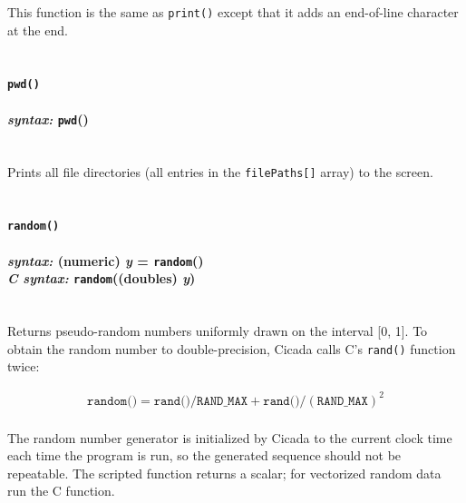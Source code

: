 \documentclass{article}
\begin{document}
This function is the same as \texttt{print()} except that it adds an end-of-line character at the end.\\\\





\paragraph{\texttt{pwd()}\\\\
\normalfont \emph{syntax: } \texttt{pwd}()\\\\}

Prints all file directories (all entries in the \verb#filePaths[]# array) to the screen.\\\\





\paragraph{\texttt{random()}\\\\
\normalfont \emph{syntax: } (numeric) \emph{y} = \texttt{random}()\\
\normalfont \emph{C syntax: } \texttt{random}((doubles) \emph{y})\\\\}

Returns pseudo-random numbers uniformly drawn on the interval [0, 1].  To obtain the random number to double-precision, Cicada calls C's \verb$rand()$ function twice:

\begin{align*}
\texttt{random()} = \texttt{rand()}/\texttt{RAND\_MAX} + \texttt{rand()}/(\texttt{RAND\_MAX})^2\\
\end{align*}

\noindent The random number generator is initialized by Cicada to the current clock time each time the program is run, so the generated sequence should not be repeatable.  The scripted function returns a scalar; for vectorized random data run the C function.\\
\end{document}
